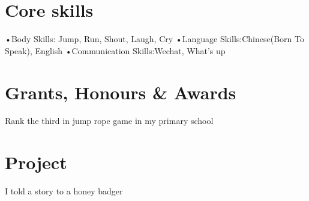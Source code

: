\documentclass[11pt]{article}
\begin{document}
\section*{Core skills}
•Body Skills: Jump, Run, Shout, Laugh, Cry
\vspace{0.01\textheight}
•Language Skills:Chinese(Born To Speak), English
\vspace{0.01\textheight}
•Communication Skills:Wechat, What's up



\section*{Grants, Honours \& Awards}
Rank the third in jump rope game in my primary school  


\section*{Project}
 I told a story to a honey badger
\end{document}
